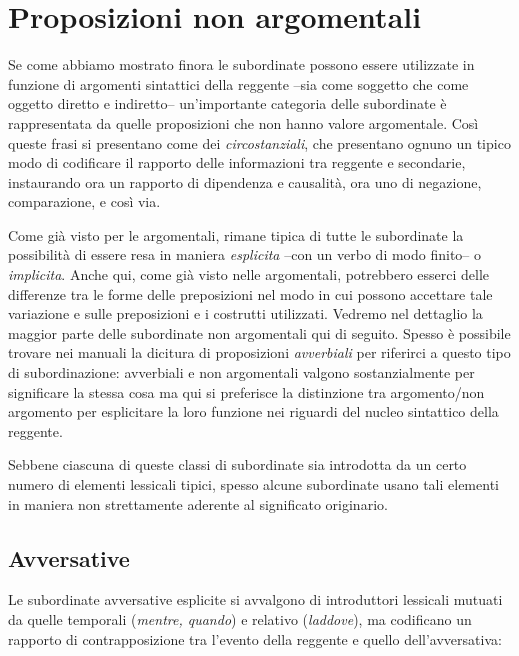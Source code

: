 \documentclass[
  a4paper,
  twoside,
  11pt,
  chapterprefix=false,
  bibliography=totocnumbered,
  listof=flat]{scrbook}
\begin{document}
\hypertarget{proposizioni-non-argomentali}{%
\chapter{Proposizioni non argomentali}\label{proposizioni-non-argomentali}}

Se come abbiamo mostrato finora le subordinate possono essere utilizzate in funzione di argomenti sintattici della reggente --sia come soggetto che come oggetto diretto e indiretto-- un'importante categoria delle subordinate è rappresentata da quelle proposizioni che non hanno valore argomentale. Così queste frasi si presentano come dei \emph{circostanziali}, che presentano ognuno un tipico modo di codificare il rapporto delle informazioni tra reggente e secondarie, instaurando ora un rapporto di dipendenza e causalità, ora uno di negazione, comparazione, e così via.

Come già visto per le argomentali, rimane tipica di tutte le subordinate la possibilità di essere resa in maniera \emph{esplicita} --con un verbo di modo finito-- o \emph{implicita}. Anche qui, come già visto nelle argomentali, potrebbero esserci delle differenze tra le forme delle preposizioni nel modo in cui possono accettare tale variazione e sulle preposizioni e i costrutti utilizzati. Vedremo nel dettaglio la maggior parte delle subordinate non argomentali qui di seguito. Spesso è possibile trovare nei manuali la dicitura di proposizioni \emph{avverbiali} per riferirci a questo tipo di subordinazione: avverbiali e non argomentali valgono sostanzialmente per significare la stessa cosa ma qui si preferisce la distinzione tra argomento/non argomento per esplicitare la loro funzione nei riguardi del nucleo sintattico della reggente.

Sebbene ciascuna di queste classi di subordinate sia introdotta da un certo numero di elementi lessicali tipici, spesso alcune subordinate usano tali elementi in maniera non strettamente aderente al significato originario.

\hypertarget{avversative}{%
\section{Avversative}\label{avversative}}

Le subordinate avversative esplicite si avvalgono di introduttori lessicali mutuati da quelle temporali (\emph{mentre, quando}) e relativo (\emph{laddove}), ma codificano un rapporto di contrapposizione tra l'evento della reggente e quello dell'avversativa:
\end{document}
